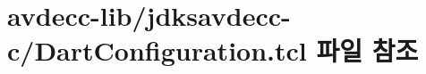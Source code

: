 \hypertarget{avdecc-lib_2jdksavdecc-c_2_dart_configuration_8tcl}{}\section{avdecc-\/lib/jdksavdecc-\/c/\+Dart\+Configuration.tcl 파일 참조}
\label{avdecc-lib_2jdksavdecc-c_2_dart_configuration_8tcl}
